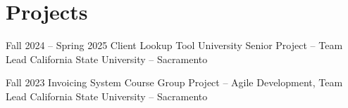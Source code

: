 \section{Projects}

\cventry
    {Fall 2024 -- Spring 2025}
    {Client Lookup Tool}
    {University Senior Project -- Team Lead}
    {California State University -- Sacramento}
    {}
    {}

\cventry
    {Fall 2023}
    {Invoicing System}
    {Course Group Project -- Agile Development, Team Lead}
    {California State University -- Sacramento}
    {}
    {}
